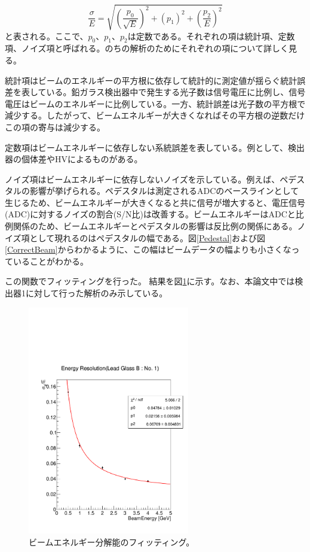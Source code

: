 \begin{equation}
\frac{\sigma}{E} = \sqrt{\left(\frac{p_0}{\sqrt{E}}\right)^2+(p_1)^2 +\left(\frac{p_2}{E}\right)^2}
\end{equation}
と表される。ここで、$p_0$、$p_1$、$p_2$は定数である。それぞれの項は統計項、定数項、ノイズ項と呼ばれる。のちの解析のためにそれぞれの項について詳しく見る。

統計項はビームのエネルギーの平方根に依存して統計的に測定値が揺らぐ統計誤差を表している。鉛ガラス検出器中で発生する光子数は信号電圧に比例し、信号電圧はビームのエネルギーに比例している。一方、統計誤差は光子数の平方根で減少する。したがって、ビームエネルギーが大きくなればその平方根の逆数だけこの項の寄与は減少する。

定数項はビームエネルギーに依存しない系統誤差を表している。例として、検出器の個体差やHVによるものがある。

ノイズ項はビームエネルギーに依存しないノイズを示している。例えば、ペデスタルの影響が挙げられる。ペデスタルは測定されるADCのベースラインとして生じるため、ビームエネルギーが大きくなると共に信号が増大すると、電圧信号(ADC)に対するノイズの割合(S/N比)は改善する。ビームエネルギーはADCと比例関係のため、ビームエネルギーとペデスタルの影響は反比例の関係にある。ノイズ項として現れるのはペデスタルの幅である。図\ref{Pedestal}および図\ref{CorrectBeam}からわかるように、この幅はビームデータの幅よりも小さくなっていることがわかる。

この関数でフィッティングを行った。
結果を図\ref{res_re}に示す。なお、本論文中では検出器1に対して行った解析のみ示している。

\begin{figure}[h]
	\begin{center}
		\includegraphics[width=200pt]{./Figure/EBESAnalysis/res_re.pdf}
		\caption[ビームエネルギー分解能のフィッティング]{ビームエネルギー分解能のフィッティング。}
		\label{res_re}
	\end{center}
\end{figure}

